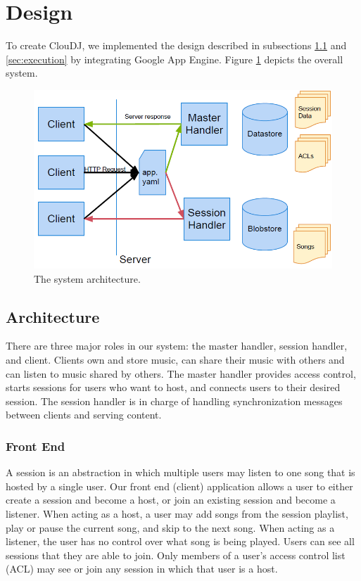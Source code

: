 \section{Design}
\label{sec:design}
To create ClouDJ, we implemented the design described 
in subsections \ref{sec:architecture} and \ref{sec:execution} 
by integrating Google App Engine. 
Figure \ref{fig:arch} depicts the overall system.

\begin{figure}[ht]
\centering
\includegraphics[width=160mm]{architecture.png}
\caption{The system architecture.}
\label{fig:arch}
\end{figure}

\subsection{Architecture}
\label{sec:architecture}
There are three major roles in our system: 
the master handler, session handler, and client. Clients own 
and store music, can share their music with others 
and can listen to music shared by others. The master handler provides 
access control, starts sessions for users who want to host, and
connects users to their desired session. The session 
handler is in charge of handling synchronization messages between clients
and serving content.

\subsubsection{Front End}
\label{sec:frontend}
A session is an abstraction in which multiple users 
may listen to one song that is hosted by a single user. 
Our front end (client) application allows a user to either 
create a session and become a host, or join an existing 
session and become a listener. When acting as a host, 
a user may add songs from the session playlist, 
play or pause the current song, and skip to the next song. 
When acting as a listener, the user has 
no control over what song is being played. Users can 
see all sessions that they are able to join. Only 
members of a user's access control list (ACL) may 
see or join any session in which that user is a host.

